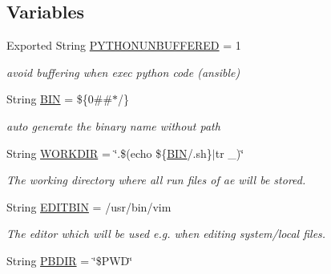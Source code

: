 \subsection*{Variables}
\begin{DoxyCompactItemize}
\item 
Exported String \mbox{\hyperlink{ansible__engine_8sh_af6d5a9916e4dc573ceb5dcc099e131a3}{P\+Y\+T\+H\+O\+N\+U\+N\+B\+U\+F\+F\+E\+R\+ED}} = 1
\begin{DoxyCompactList}\small\item\em avoid buffering when exec python code (ansible) \end{DoxyCompactList}\item 
\mbox{\label{ansible__engine_8sh_a4cdf0b70265066d6127339b05fd497c1}} 
String \mbox{\hyperlink{ansible__engine_8sh_a4cdf0b70265066d6127339b05fd497c1}{B\+IN}} = \$\{0\#\#$\ast$/\}
\begin{DoxyCompactList}\small\item\em auto generate the binary name without path \end{DoxyCompactList}\item 
\mbox{\label{ansible__engine_8sh_a65ed767ae8d8b098d10bef5621b44918}} 
String \mbox{\hyperlink{ansible__engine_8sh_a65ed767ae8d8b098d10bef5621b44918}{W\+O\+R\+K\+D\+IR}} = \char`\"{}.\$(echo \$\{\mbox{\hyperlink{ansible__engine_8sh_a4cdf0b70265066d6127339b05fd497c1}{B\+IN}}/.sh\}$\vert$tr \+\_\+)\char`\"{}
\begin{DoxyCompactList}\small\item\em The working directory where all run files of ae will be stored. \end{DoxyCompactList}\item 
\mbox{\label{ansible__engine_8sh_a90f3e5b40645b8ebe43db8f146fbaded}} 
String \mbox{\hyperlink{ansible__engine_8sh_a90f3e5b40645b8ebe43db8f146fbaded}{E\+D\+I\+T\+B\+IN}} = /usr/bin/vim
\begin{DoxyCompactList}\small\item\em The editor which will be used e.\+g. when editing system/local files. \end{DoxyCompactList}\item 
\mbox{\label{ansible__engine_8sh_ad6dc768bd04c52f11f0a3416c7157576}} 
String \mbox{\hyperlink{ansible__engine_8sh_ad6dc768bd04c52f11f0a3416c7157576}{P\+B\+D\+IR}} = \char`\"{}\$P\+WD\char`\"{}

\end{DoxyCompactItemize}
